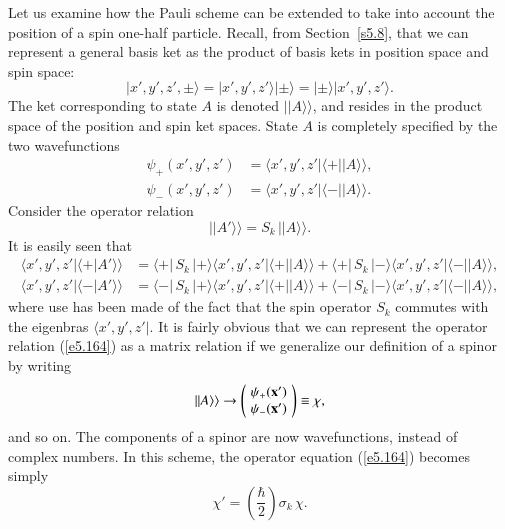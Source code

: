 Let us examine how the Pauli scheme can be extended to take into account the
position of a spin one-half particle. Recall, from Section~\ref{s5.8},
that we can represent a general basis ket  as the product
of basis kets in position space and  spin space:
\begin{equation}
|x', y', z', \pm\rangle = |x',y',z'\rangle |\pm \rangle = |\pm \rangle|
x',y',z'\rangle .
\end{equation}
The ket corresponding to state $A$ is denoted $||A\rangle\rangle$, and resides
in the product space of the position and spin ket spaces. State $A$ is completely
specified by the two wavefunctions
\begin{align}
\psi_+(x', y', z') &= \langle x',y', z'|\langle +||A\rangle\rangle,\\[0.5ex]
\psi_-(x', y', z') &= \langle x',y',z'|\langle -||A\rangle\rangle.
\end{align}
Consider the operator relation
\begin{equation}\label{e5.164}
||A'\rangle\rangle = S_k\, ||A\rangle\rangle.
\end{equation}
It is easily seen that 
\begin{align}
\langle x', y', z'| \langle +|A'\rangle\rangle &=
\langle + |\,S_k\, |+\rangle \langle x',y',z'|\langle +||A\rangle\rangle+\langle + |\,S_k \,|-\rangle \langle x',y',z'|\langle -||A\rangle\rangle,\\[0.5ex]
\langle x', y', z'| \langle -|A'\rangle\rangle &=
\langle - |\,S_k \,|+\rangle \langle x',y',z'|\langle +||A\rangle\rangle+\langle -
|\,S_k\, |-\rangle \langle x',y',z'|\langle -||A\rangle\rangle,
\end{align}
where use has been made of the fact that the spin operator $S_k$  commutes with the
eigenbras $\langle x', y', z'|$. 
It is fairly obvious  that we can represent the operator relation (\ref{e5.164}) as a matrix relation
if we generalize our definition of a spinor by writing
\begin{equation}\label{e5.166}
||A\rangle\rangle \rightarrow \left(\! \begin{array}{c}\psi_+({\bf x}') \\
\psi_-({\bf x}')\end{array}\!\right)\equiv \chi,
\end{equation}
and so on. The components of a spinor are now wavefunctions, instead of 
complex numbers. In this scheme, the operator equation (\ref{e5.164})  becomes simply
\begin{equation}
\chi' = \left(\frac{\hbar}{2}\right) \sigma_k \,\chi.
\end{equation}

